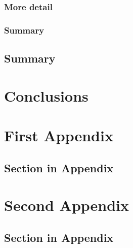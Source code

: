 \documentclass[times,12pt,thesis,online]{uom_thesis_casson} %
\begin{document}
	\subsection{More detail}
	\lipsum[1-3] %
	
	\subsection{Summary}
	\lipsum[1] %
  
  \section{Summary}
    \lipsum[6] %



\chapter{Conclusions}
  \lipsum[1] %



\printbibliography[title={References},heading=bibintoc] %



\begin{uomappendix} 
  \chapter{First Appendix} \label{sec:example_appendix}
    \section{Section in Appendix}
    \lipsum[1-6]

  \chapter{Second Appendix}
    \section{Section in Appendix}
    \lipsum[1-6]
\end{uomappendix}



\end{document}
